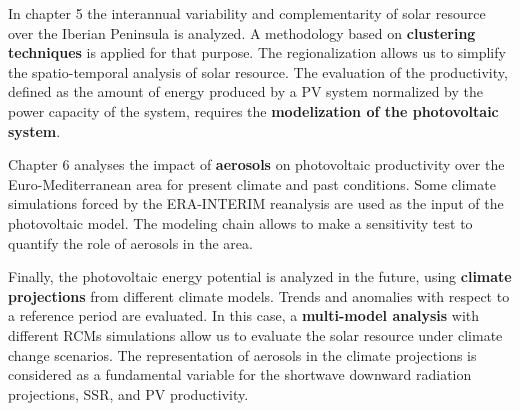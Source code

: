   In chapter 5 the interannual variability and complementarity of solar resource over the Iberian Peninsula is analyzed. A methodology based on \textbf{clustering techniques} is applied for that purpose. The regionalization allows us to simplify the spatio-temporal analysis of solar resource. The evaluation of the productivity, defined as the amount of energy produced by a PV system normalized by the power capacity of the system, requires the \textbf{modelization of the photovoltaic system}.
  
  Chapter 6 analyses the impact of \textbf{aerosols} on photovoltaic productivity over the Euro-Mediterranean area for present climate and past conditions.  Some climate simulations forced by the ERA-INTERIM reanalysis are used as the input of the photovoltaic model. The modeling chain allows to make a sensitivity test to quantify the role of aerosols in the area.

  
  Finally, the photovoltaic energy potential is analyzed in the future, using \textbf{climate projections} from different climate models. Trends and anomalies with respect to a reference period are evaluated. In this case, a \textbf{multi-model analysis} with different RCMs simulations allow us to evaluate the solar resource under climate change scenarios. The representation of aerosols in the climate projections is considered as a fundamental variable for the shortwave downward radiation projections, SSR, and PV productivity.

  
  
